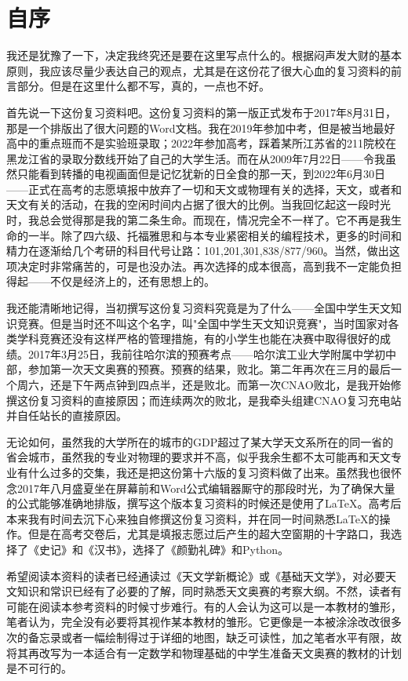 \chapter{自序}
我还是犹豫了一下，决定我终究还是要在这里写点什么的。根据闷声发大财的基本原则，我应该尽量少表达自己的观点，尤其是在这份花了很大心血的复习资料的前言部分。但是在这里什么都不写，真的，一点也不好。

首先说一下这份复习资料吧。这份复习资料的第一版正式发布于2017年8月31日，那是一个排版出了很大问题的Word文档。我在2019年参加中考，但是被当地最好高中的重点班而不是实验班录取；2022年参加高考，踩着某所江苏省的211院校在黑龙江省的录取分数线开始了自己的大学生活。而在从2009年7月22日——令我虽然只能看到转播的电视画面但是记忆犹新的日全食的那一天，到2022年6月30日——正式在高考的志愿填报中放弃了一切和天文或物理有关的选择，天文，或者和天文有关的活动，在我的空闲时间内占据了很大的比例。当我回忆起这一段时光时，我总会觉得那是我的第二条生命。而现在，情况完全不一样了。它不再是我生命的一半。除了四六级、托福雅思和与本专业紧密相关的编程技术，更多的时间和精力在逐渐给几个考研的科目代号让路：101,201,301,838/877/960。当然，做出这项决定时非常痛苦的，可是也没办法。再次选择的成本很高，高到我不一定能负担得起——不仅是经济上的，还有思想上的。

我还能清晰地记得，当初撰写这份复习资料究竟是为了什么——全国中学生天文知识竞赛。但是当时还不叫这个名字，叫"全国中学生天文知识竞赛"，当时国家对各类学科竞赛还没有这样严格的管理措施，有的小学生也能在决赛中取得很好的成绩。2017年3月25日，我前往哈尔滨的预赛考点——哈尔滨工业大学附属中学初中部，参加第一次天文奥赛的预赛。预赛的结果，败北。第二年再次在三月的最后一个周六，还是下午两点钟到四点半，还是败北。而第一次CNAO败北，是我开始修撰这份复习资料的直接原因；而连续两次的败北，是我牵头组建CNAO复习充电站并自任站长的直接原因。

无论如何，虽然我的大学所在的城市的GDP超过了某大学天文系所在的同一省的省会城市，虽然我的专业对物理的要求并不高，似乎我余生都不太可能再和天文专业有什么过多的交集，我还是把这份第十六版的复习资料做了出来。虽然我也很怀念2017年八月盛夏坐在屏幕前和Word公式编辑器厮守的那段时光，为了确保大量的公式能够准确地排版，撰写这个版本复习资料的时候还是使用了\LaTeX。高考后本来我有时间去沉下心来独自修撰这份复习资料，并在同一时间熟悉\LaTeX 的操作。但是在高考交卷后，尤其是填报志愿过后产生的超大空窗期的十字路口，我选择了《史记》和《汉书》，选择了《颜勤礼碑》和Python。

希望阅读本资料的读者已经通读过《天文学新概论》或《基础天文学》，对必要天文知识和常识已经有了必要的了解，同时熟悉天文奥赛的考察大纲。不然，读者有可能在阅读本参考资料的时候寸步难行。有的人会认为这可以是一本教材的雏形，笔者认为，完全没有必要将其视作某本教材的雏形。它更像是一本被涂涂改改很多次的备忘录或者一幅绘制得过于详细的地图，缺乏可读性，加之笔者水平有限，故将其再改写为一本适合有一定数学和物理基础的中学生准备天文奥赛的教材的计划是不可行的。


